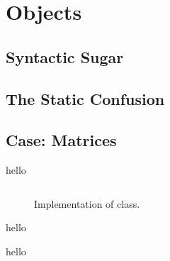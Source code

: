 \chapter{Objects}




\section{Syntactic Sugar}



\section{The Static Confusion}



\section{Case: Matrices}

\csharpsection{\csharp}
hello

\begin{figure}[tbp]
  \inputminted[fontsize=\footnotesize]{csharp}{../src/csharp/matrix/Matrix.cs}
  \caption{Implementation of  class.}
  \label{fig:objects:matrix:lib}
\end{figure}

hello

hello


